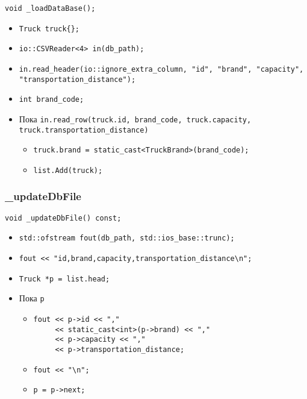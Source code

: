 \begin{lstlisting}
void _loadDataBase();
\end{lstlisting}

\begin{itemize}
	\item \verb|Truck truck{};|
	\item \verb|io::CSVReader<4> in(db_path);|
	\item \verb|in.read_header(io::ignore_extra_column, "id", "brand", "capacity", "transportation_distance");|
	\item \verb|int brand_code;|
	\item Пока \verb|in.read_row(truck.id, brand_code, truck.capacity, truck.transportation_distance)|
	\begin{itemize}
		\item \verb|truck.brand = static_cast<TruckBrand>(brand_code);|
		\item \verb|list.Add(truck);|
	\end{itemize}
\end{itemize}

\subsubsection*{\_updateDbFile}

\begin{lstlisting}
void _updateDbFile() const;
\end{lstlisting}

\begin{itemize}
	\item \verb|std::ofstream fout(db_path, std::ios_base::trunc);|
	\item \verb|fout << "id,brand,capacity,transportation_distance\n";|
	\item \verb|Truck *p = list.head;|
	\item Пока \verb|p|
	\begin{itemize}
		\item 
		\verb|fout << p->id << ","|\\
		\verb|     << static_cast<int>(p->brand) << ","|\\
		\verb|     << p->capacity << ","|\\
		\verb|     << p->transportation_distance;|
		\item \verb|fout << "\n";|
		\item \verb|p = p->next;|
	\end{itemize}
\end{itemize}


